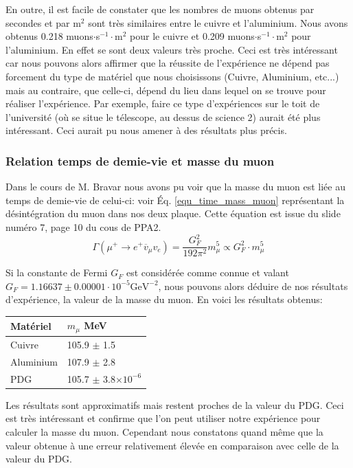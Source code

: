 \documentclass[12pt]{article}
\begin{document}
    En outre, il est facile de constater que les nombres de muons obtenus par secondes et par m$^{2}$ sont très similaires entre le cuivre et l'aluminium. Nous avons obtenus 0.218 muons$\cdot$s$^{-1}\cdot$m$^{2}$ pour le cuivre et 0.209 muons$\cdot$s$^{-1}\cdot$m$^{2}$ pour l'aluminium. En effet se sont deux valeurs très proche. Ceci est très intéressant car nous pouvons alors affirmer que la réussite de l'expérience ne dépend pas forcement du type de matériel que nous choisissons (Cuivre, Aluminium, etc...) mais au contraire, que celle-ci, dépend du lieu dans lequel on se trouve pour réaliser l'expérience. Par exemple, faire ce type d'expériences sur le toit de l'université (où se situe le télescope, au dessus de science 2) aurait été plus intéressant. Ceci aurait pu nous amener à des résultats plus précis. 

\subsubsection{Relation temps de demie-vie et masse du muon}

Dans le cours de M. Bravar nous avons pu voir que la masse du muon est liée au temps de demie-vie de celui-ci: voir Éq. \ref{equ_time_mass_muon} représentant la désintégration du muon dans nos deux plaque. Cette équation est issue du slide numéro 7, page 10 du cous de PPA2.
\begin{equation}
\Gamma\left(\mu^{+} \rightarrow e^{+} \overline{v}_{\mu} v_{e}\right)=\frac{G_{F}^{2}}{192 \pi^{2}} m_{\mu}^{5} \propto G_{F}^{2}\cdot m_{\mu}^{5} 
\label{equ_time_mass_muon}
\end{equation}

Si la constante de Fermi $G_{F}$ est considérée comme connue et valant $G_{F}=1.16637\pm0.00001\cdot10^{-5} \text{GeV}^{-2}$, nous pouvons alors déduire de nos résultats d'expérience, la valeur de la masse du muon. En voici les résultats obtenus:


\begin{center}
\begin{tabular}{ll}
    Matériel & $m_{\mu}$ MeV\\
    \hline
    Cuivre & 105.9 $\pm$ 1.5 \\
    Aluminium & 107.9 $\pm$ 2.8\\
    PDG & 105.7 $\pm$ 3.8$\times10^{-6}$ \\
\end{tabular}
\end{center}

Les résultats sont approximatifs mais restent proches de la valeur du PDG. Ceci est très intéressant et confirme que l'on peut utiliser notre expérience pour calculer la masse du muon. Cependant nous constatons quand même que la valeur obtenue à une erreur relativement élevée en comparaison avec celle de la valeur du PDG. 
\end{document}
